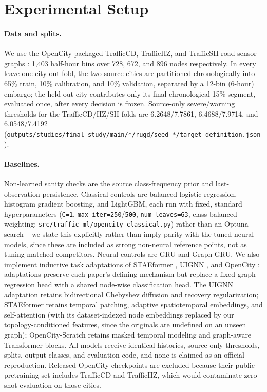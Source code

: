 \section{Experimental Setup}
\label{sec:setup}

\paragraph{Data and splits.} We use the OpenCity-packaged TrafficCD, TrafficHZ, and TrafficSH
road-sensor graphs \citep{neun2022traffic4cast22,li2025opencity}: 1{,}403 half-hour bins over
728, 672, and 896 nodes respectively. In every leave-one-city-out fold, the two source cities are
partitioned chronologically into 65\% train, 10\% calibration, and 10\% validation, separated by a
12-bin (6-hour) embargo; the held-out city contributes only its final chronological 15\% segment,
evaluated once, after every decision is frozen. Source-only severe/warning thresholds for the
TrafficCD/HZ/SH folds are 6.2648/7.7861, 6.4688/7.9714, and 6.0548/7.4192
(\texttt{outputs/studies/final\_study/main/*/rugd/seed\_*/target\_definition.json}).

\paragraph{Baselines.} Non-learned sanity checks are the source class-frequency prior and
last-observation persistence. Classical controls are balanced logistic regression, histogram
gradient boosting, and LightGBM, each run with fixed, standard hyperparameters (\texttt{C=1},
\texttt{max\_iter=250}/\texttt{500}, \texttt{num\_leaves=63}, class-balanced weighting;
\texttt{src/traffic\_ml/opencity\_classical.py}) rather than an Optuna search -- we state this
explicitly rather than imply parity with the tuned neural models, since these are included as
strong non-neural reference points, not as tuning-matched competitors. Neural controls are GRU and
Graph-GRU. We also implement inductive task adaptations of STAEformer \citep{liu2023staeformer},
UIGNN \citep{mei2023uignn}, and OpenCity \citep{li2025opencity}: adaptations preserve each paper's
defining mechanism but replace a fixed-graph regression head with a shared node-wise classification
head. The UIGNN adaptation retains bidirectional Chebyshev diffusion and recovery regularization;
STAEformer retains temporal patching, adaptive spatiotemporal embeddings, and self-attention (with
its dataset-indexed node embeddings replaced by our topology-conditioned features, since the
originals are undefined on an unseen graph); OpenCity-Scratch retains masked temporal modeling and
graph-aware Transformer blocks. All models receive identical histories, source-only thresholds,
splits, output classes, and evaluation code, and none is claimed as an official reproduction.
Released OpenCity checkpoints are excluded because their public pretraining set includes TrafficCD
and TrafficHZ, which would contaminate zero-shot evaluation on those cities.

